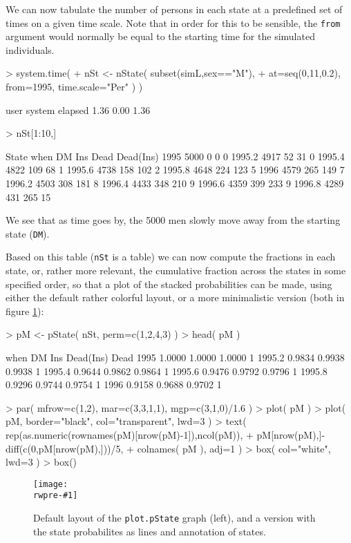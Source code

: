 \documentclass[a4paper,twoside,12pt]{report}
\newcommand{\rwpre}{sL}
\newcommand{\insfig}[3]{
\begin{figure}[h]
  \centering
  \texttt{[image: \\rwpre-\#1]}
  \caption{#3}
  \label{fig:#1}
\end{figure}}
\begin{document}
We can now tabulate the number of persons in each state at a
predefined set of times on a given time scale. Note that in order for
this to be sensible, the \texttt{from} argument would normally be
equal to the starting time for the simulated individuals.
\begin{Schunk}
\begin{Sinput}
> system.time(
+ nSt <- nState( subset(simL,sex=="M"),
+                at=seq(0,11,0.2), from=1995, time.scale="Per" ) )
\end{Sinput}
\begin{Soutput}
   user  system elapsed 
   1.36    0.00    1.36 
\end{Soutput}
\begin{Sinput}
> nSt[1:10,]
\end{Sinput}
\begin{Soutput}
        State
when       DM Ins Dead Dead(Ins)
  1995   5000   0    0         0
  1995.2 4917  52   31         0
  1995.4 4822 109   68         1
  1995.6 4738 158  102         2
  1995.8 4648 224  123         5
  1996   4579 265  149         7
  1996.2 4503 308  181         8
  1996.4 4433 348  210         9
  1996.6 4359 399  233         9
  1996.8 4289 431  265        15
\end{Soutput}
\end{Schunk}
We see that as time goes by, the 5000 men slowly move away from the
starting state (\texttt{DM}).

Based on this table (\texttt{nSt} is a table) we can now compute the
fractions in each state, or, rather more relevant, the cumulative fraction
across the states in some specified order, so that a plot of the
stacked probabilities can be made, using either the default rather
colorful layout, or a more minimalistic version (both in figure \ref{fig:pstate0}):
\begin{Schunk}
\begin{Sinput}
> pM <- pState( nSt, perm=c(1,2,4,3) )
> head( pM )
\end{Sinput}
\begin{Soutput}
when         DM    Ins Dead(Ins) Dead
  1995   1.0000 1.0000    1.0000    1
  1995.2 0.9834 0.9938    0.9938    1
  1995.4 0.9644 0.9862    0.9864    1
  1995.6 0.9476 0.9792    0.9796    1
  1995.8 0.9296 0.9744    0.9754    1
  1996   0.9158 0.9688    0.9702    1
\end{Soutput}
\begin{Sinput}
> par( mfrow=c(1,2), mar=c(3,3,1,1), mgp=c(3,1,0)/1.6 )
> plot( pM )
> plot( pM, border="black", col="transparent", lwd=3 )
> text( rep(as.numeric(rownames(pM)[nrow(pM)-1]),ncol(pM)),
+       pM[nrow(pM),]-diff(c(0,pM[nrow(pM),]))/5,
+       colnames( pM ), adj=1 )
> box( col="white", lwd=3 )
> box()
\end{Sinput}
\end{Schunk}
\insfig{pstate0}{1.0}{Default layout of the \textrm{\tt plot.pState}
  graph (left), and a version with the state probabilites as lines and
  annotation of states.}
\end{document}
